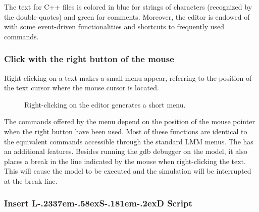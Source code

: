 \documentclass [11pt,a4paper] {book}
\def\LsD{{L\kern-.2337em\lower-.58ex\hbox{S}\kern-.181em\lower-.2ex\hbox{D}}\xspace}
\begin{document}
The text for C++ files is colored in blue for strings of characters (recognized by the double-quotes) and green for comments. Moreover, the editor is endowed of with some event-driven functionalities and shortcuts to frequently used commands.

\subsubsection{Click with the right button of the mouse}
Right-clicking on a text makes a small menu appear, referring to the position of the text cursor where the mouse cursor is located.
\begin{figure}[ht]
  \centering
  \caption{Right-clicking on the editor generates a short menu.}
  \label{fig:LMM_minimenu}
\end{figure}

The commands offered by the menu depend on the position of the mouse pointer when the right button have been used. Most of these functions are identical to the equivalent commands accessible through the standard LMM menus. The  has an additional features. Besides running the gdb debugger on the model, it also places a break in the line indicated by the mouse when right-clicking the text. This will cause the model to be executed and the simulation will be interrupted at the break line.

\subsubsection{Insert \LsD Script }
\end{document}
